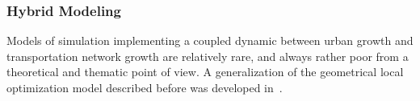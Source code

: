 \subsubsection{Hybrid Modeling}






Models of simulation implementing a coupled dynamic between urban growth and transportation network growth are relatively rare, and always rather poor from a theoretical and thematic point of view. A generalization of the geometrical local optimization model described before was developed in~\cite{barthelemy2009co}. %

